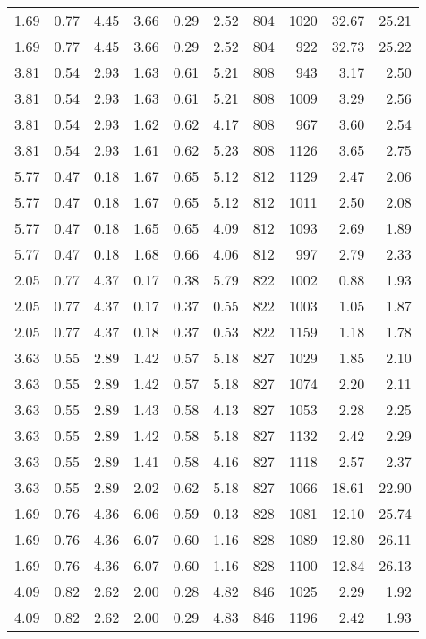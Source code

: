 \begin{longtable}{rrrrrrrrrr}
1.69	&	0.77	&	4.45	&	3.66	&	0.29	&	2.52	&	804	&	1020	&	32.67	&	25.21	\\
1.69	&	0.77	&	4.45	&	3.66	&	0.29	&	2.52	&	804	&	922	&	32.73	&	25.22	\\
3.81	&	0.54	&	2.93	&	1.63	&	0.61	&	5.21	&	808	&	943	&	3.17	&	2.50	\\
3.81	&	0.54	&	2.93	&	1.63	&	0.61	&	5.21	&	808	&	1009	&	3.29	&	2.56	\\
3.81	&	0.54	&	2.93	&	1.62	&	0.62	&	4.17	&	808	&	967	&	3.60	&	2.54	\\
3.81	&	0.54	&	2.93	&	1.61	&	0.62	&	5.23	&	808	&	1126	&	3.65	&	2.75	\\
5.77	&	0.47	&	0.18	&	1.67	&	0.65	&	5.12	&	812	&	1129	&	2.47	&	2.06	\\
5.77	&	0.47	&	0.18	&	1.67	&	0.65	&	5.12	&	812	&	1011	&	2.50	&	2.08	\\
5.77	&	0.47	&	0.18	&	1.65	&	0.65	&	4.09	&	812	&	1093	&	2.69	&	1.89	\\
5.77	&	0.47	&	0.18	&	1.68	&	0.66	&	4.06	&	812	&	997	&	2.79	&	2.33	\\
2.05	&	0.77	&	4.37	&	0.17	&	0.38	&	5.79	&	822	&	1002	&	0.88	&	1.93	\\
2.05	&	0.77	&	4.37	&	0.17	&	0.37	&	0.55	&	822	&	1003	&	1.05	&	1.87	\\
2.05	&	0.77	&	4.37	&	0.18	&	0.37	&	0.53	&	822	&	1159	&	1.18	&	1.78	\\
3.63	&	0.55	&	2.89	&	1.42	&	0.57	&	5.18	&	827	&	1029	&	1.85	&	2.10	\\
3.63	&	0.55	&	2.89	&	1.42	&	0.57	&	5.18	&	827	&	1074	&	2.20	&	2.11	\\
3.63	&	0.55	&	2.89	&	1.43	&	0.58	&	4.13	&	827	&	1053	&	2.28	&	2.25	\\
3.63	&	0.55	&	2.89	&	1.42	&	0.58	&	5.18	&	827	&	1132	&	2.42	&	2.29	\\
3.63	&	0.55	&	2.89	&	1.41	&	0.58	&	4.16	&	827	&	1118	&	2.57	&	2.37	\\
3.63	&	0.55	&	2.89	&	2.02	&	0.62	&	5.18	&	827	&	1066	&	18.61	&	22.90	\\
1.69	&	0.76	&	4.36	&	6.06	&	0.59	&	0.13	&	828	&	1081	&	12.10	&	25.74	\\
1.69	&	0.76	&	4.36	&	6.07	&	0.60	&	1.16	&	828	&	1089	&	12.80	&	26.11	\\
1.69	&	0.76	&	4.36	&	6.07	&	0.60	&	1.16	&	828	&	1100	&	12.84	&	26.13	\\
4.09	&	0.82	&	2.62	&	2.00	&	0.28	&	4.82	&	846	&	1025	&	2.29	&	1.92	\\
4.09	&	0.82	&	2.62	&	2.00	&	0.29	&	4.83	&	846	&	1196	&	2.42	&	1.93	\\

\end{longtable}
